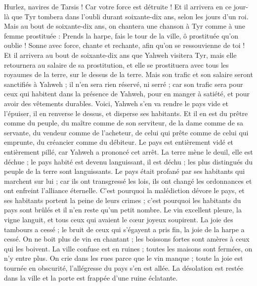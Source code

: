 \begin{multicols}{2}
Hurlez, navires de Tarsis ! Car votre force est détruite !
Et il arrivera en ce jour-là que Tyr tombera dans l'oubli durant soixante-dix ans, selon les jours d'un roi. Mais au bout de soixante-dix ans, on chantera une chanson à Tyr comme à une femme prostituée :
Prends la harpe, fais le tour de la ville, ô prostituée qu'on oublie ! Sonne avec force, chante et rechante, afin qu'on se ressouvienne de toi !
Et il arrivera au bout de soixante-dix ans que Yahweh visitera Tyr, mais elle retournera au salaire de sa prostitution, et elle se prostituera avec tous les royaumes de la terre, sur le dessus de la terre.
Mais son trafic et son salaire seront sanctifiés à Yahweh ; il n'en sera rien réservé, ni serré ; car son trafic sera pour ceux qui habitent dans la présence de Yahweh, pour en manger à satiété, et pour avoir des vêtements durables.
\VerseOne{}Voici, Yahweh s'en va rendre le pays vide et l'épuiser, il en renverse le dessus, et disperse ses habitants.
Et il en est du prêtre comme du peuple, du maître comme de son serviteur, de la dame comme de sa servante, du vendeur comme de l'acheteur, de celui qui prête comme de celui qui emprunte, du créancier comme du débiteur.
Le pays est entièrement vidé et entièrement pillé, car Yahweh a prononcé cet arrêt.
La terre mène le deuil, elle est déchue ; le pays habité est devenu languissant, il est déchu ; les plus distingués du peuple de la terre sont languissants.
Le pays était profané par ses habitants qui marchent sur lui ; car ils ont transgressé les lois, ils ont changé les ordonnances et ont enfreint l'alliance éternelle.
C'est pourquoi la malédiction dévore le pays, et ses habitants portent la peine de leurs crimes ; c'est pourquoi les habitants du pays sont brûlés et il n'en reste qu'un petit nombre.
Le vin excellent pleure, la vigne languit, et tous ceux qui avaient le cœur joyeux soupirent.
La joie des tambours a cessé ; le bruit de ceux qui s'égayent a pris fin, la joie de la harpe a cessé.
On ne boit plus de vin en chantant ; les boissons fortes sont amères à ceux qui les boivent.
La ville confuse est en ruines ; toutes les maisons sont fermées, on n'y entre plus.
On crie dans les rues parce que le vin manque ; toute la joie est tournée en obscurité, l'allégresse du pays s'en est allée.
La désolation est restée dans la ville et la porte est frappée d'une ruine éclatante.

\end{multicols}
